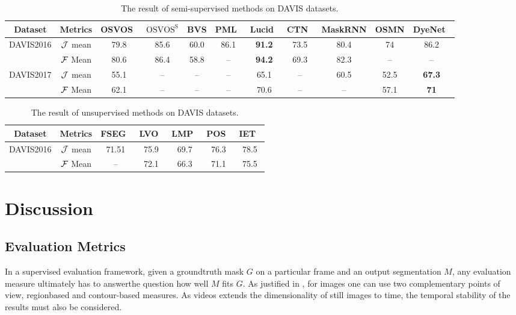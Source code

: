 \begin{table*}[ht]
	\begin{center}
		\setlength\tabcolsep{1pt}
		\begin{tabular}{|c|c|c|c|c|c|c|c|c|c|c|}
		\hline
Dataset& Metrics &OSVOS~\cite{OSVOS} &$\text{OSVOS}^\text{S}$\cite{OSVOS-S} &BVS\cite{BVS} &PML~\cite{PML} &Lucid~\cite{LucidTracker} &CTN~\cite{CTN} &MaskRNN\cite{MaskRNN} &OSMN\cite{OSMN} &DyeNet~\cite{DyeNet} \\
\hline
\multirow{2}{*}{DAVIS2016} &$\mathcal{J}$ mean  &79.8 &85.6 & 60.0 &86.1 &\textbf{91.2} &73.5 &80.4 &74 &86.2 \\
\cline{2-11}
&$\mathcal{F}$ Mean  &80.6 &86.4 &58.8 &-- &\textbf{94.2} &69.3 &82.3 &-- &-- \\
\hline
\multirow{2}{*}{DAVIS2017} &$\mathcal{J}$ mean  &55.1 &-- &-- &-- &65.1 &-- &60.5 &52.5 &\textbf{67.3} \\
\cline{2-11}
&$\mathcal{F}$ Mean &62.1 &-- &-- &-- &70.6 &-- &-- &57.1 &\textbf{71}\\
\hline
\end{tabular}
\end{center}
\caption{The result of semi-supervised methods on DAVIS datasets.}
\label{table:semisuperivsed_all_dataset}
\end{table*}


\begin{table*}[ht]
	\begin{center}
		\setlength\tabcolsep{3pt}
		\begin{tabular}{|c|c|c|c|c|c|c|}
		\hline
Dataset& Metrics &FSEG~\cite{Jain2017FusionSeg}  &LVO~\cite{Tokmakov2017Learning} &LMP~\cite{Tokmakov2017Learning} & POS~\cite{Koh2017Primary} &IET~\cite{li2018instance}\\
\hline
\multirow{2}{*}{DAVIS2016} &$\mathcal{J}$ mean  &71.51   &75.9     &69.7       &76.3    &78.5\\
\cline{2-7}
&$\mathcal{F}$ Mean      &   --    &72.1  &66.3        &71.1      &75.5\\
\hline
\end{tabular}
\end{center}
\caption{The result of unsupervised methods on DAVIS datasets.}
\label{table:unsuperivsed_all_dataset}
\end{table*}

\section{Discussion}

\subsection{Evaluation Metrics}
In a supervised evaluation framework, given a groundtruth mask $G$ on a particular frame and an output segmentation $M$,
any evaluation measure ultimately has to answerthe question how well $M$ fits $G$. As justified in \cite{pont2016supervised}, 
for images one can use two complementary points of view, regionbased and contour-based measures. As videos extends the
dimensionality of still images to time, the temporal stability of the results must also be considered.





